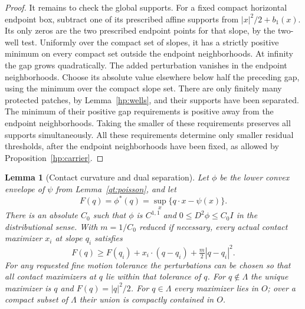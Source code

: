 \documentclass[11pt]{article}
\numberwithin{equation}{section}
\newtheorem{lemma}[theorem]{Lemma}
\theoremstyle{definition}
\theoremstyle{remark}
\begin{document}
\begin{proof}
It remains to check the global supports.  For a fixed compact horizontal
endpoint box, subtract one of its prescribed affine supports from
$|x|^2/2+b_1(x)$.  Its only zeros are the two prescribed endpoint points
for that slope, by the two-well test.  Uniformly over the compact set of
slopes, it has a strictly positive minimum on every compact set outside
the endpoint neighborhoods.  At infinity the gap grows quadratically.
The added perturbation vanishes in the endpoint neighborhoods.  Choose
its absolute value elsewhere below half the preceding gap, using the
minimum over the compact slope set.  There are only finitely many protected
patches, by Lemma~\ref{hp:wells}, and their supports have been separated.
The minimum of their positive gap requirements is positive away from
the endpoint neighborhoods.  Taking the smaller of these requirements preserves all supports
simultaneously.  All these requirements determine only smaller residual
thresholds, after the endpoint neighborhoods have been fixed, as allowed
by Proposition~\ref{hp:carrier}.
\end{proof}

\begin{lemma}[Contact curvature and dual separation]\label{qt:contact}
Let $\phi$ be the lower convex envelope of $\psi$ from
Lemma~\ref{qt:poisson}, and let
\[
 F(q)=\phi^*(q)=\sup_x\{q\cdot x-\psi(x)\}.
\]
There is an absolute $C_0$ such that $\phi$ is $C^{1,1}$ and
$0\leq D^2\phi\leq C_0 I$ in the distributional sense.
With $m=1/C_0$ reduced if necessary, every actual contact maximizer
$x_i$ at slope $q_i$ satisfies
\begin{equation}\label{qt:dual-gap}
 F(q)\geq F(q_i)+x_i\cdot(q-q_i)+\tfrac m2|q-q_i|^2.
\end{equation}
For any requested fine motion tolerance the perturbations can be chosen
so that all contact maximizers at $q$ lie within that tolerance of $q$.
For $q\notin\Lambda$ the unique maximizer is $q$ and $F(q)=|q|^2/2$.
For $q\in\Lambda$ every maximizer lies in $O$; over a compact subset of
$\Lambda$ their union is compactly contained in $O$.
\end{lemma}
\end{document}
